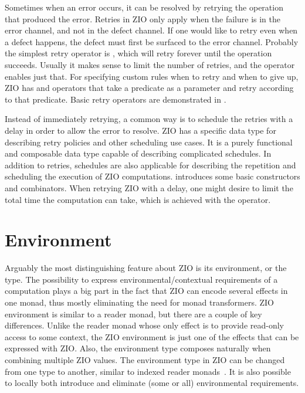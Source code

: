 

Sometimes when an error occurs, it can be resolved by retrying the operation that produced the error. Retries in ZIO only apply when the failure is in the error channel, and not in the defect channel. If one would like to retry even when a defect happens, the defect must first be surfaced to the error channel. Probably the simplest retry operator is , which will retry forever until the operation succeeds. Usually it makes sense to limit the number of retries, and the  operator enables just that. For specifying custom rules when to retry and when to give up, ZIO has  and  operators that take a predicate as a parameter and retry according to that predicate. Basic retry operators are demonstrated in .



Instead of immediately retrying, a common way is to schedule the retries with a delay in order to allow the error to resolve. ZIO has a specific data type  for describing retry policies and other scheduling use cases. It is a purely functional and composable data type capable of describing complicated schedules. In addition to retries, schedules are also applicable for describing the repetition and scheduling the execution of ZIO computations.  introduces some basic  constructors and combinators. When retrying ZIO with a delay, one might desire to limit the total time the computation can take, which is achieved with the  operator.





\section{Environment}
Arguably the most distinguishing feature about ZIO is its environment, or the  type. The possibility to express environmental/contextual requirements of a computation plays a big part in the fact that ZIO can encode several effects in one monad, thus mostly eliminating the need for monad transformers. ZIO environment is similar to a reader monad, but there are a couple of key differences. Unlike the reader monad whose only effect is to provide read-only access to some context, the ZIO environment is just one of the effects that can be expressed with ZIO. Also, the environment type composes naturally when combining multiple ZIO values. The environment type in ZIO can be changed from one type to another, similar to indexed reader monads~\cite{monad-factory}. It is also possible to locally both introduce and eliminate (some or all) environmental requirements.

